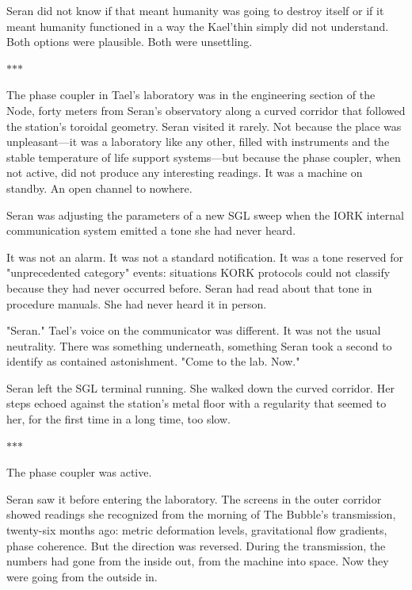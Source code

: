 \documentclass[11pt,a5paper,twoside]{book}
\begin{document}
Seran did not know if that meant humanity was going to destroy itself or if it meant humanity functioned in a way the Kael'thin simply did not understand. Both options were plausible. Both were unsettling.

\vspace{1.5em}
\begin{center}$\ast$\quad$\ast$\quad$\ast$\end{center}
\vspace{1.5em}

The phase coupler in Tael's laboratory was in the engineering section of the Node, forty meters from Seran's observatory along a curved corridor that followed the station's toroidal geometry. Seran visited it rarely. Not because the place was unpleasant—it was a laboratory like any other, filled with instruments and the stable temperature of life support systems—but because the phase coupler, when not active, did not produce any interesting readings. It was a machine on standby. An open channel to nowhere.

Seran was adjusting the parameters of a new SGL sweep when the IORK internal communication system emitted a tone she had never heard.

It was not an alarm. It was not a standard notification. It was a tone reserved for "unprecedented category" events: situations KORK protocols could not classify because they had never occurred before. Seran had read about that tone in procedure manuals. She had never heard it in person.

"Seran." Tael's voice on the communicator was different. It was not the usual neutrality. There was something underneath, something Seran took a second to identify as contained astonishment. "Come to the lab. Now."

Seran left the SGL terminal running. She walked down the curved corridor. Her steps echoed against the station's metal floor with a regularity that seemed to her, for the first time in a long time, too slow.

\vspace{1.5em}
\begin{center}$\ast$\quad$\ast$\quad$\ast$\end{center}
\vspace{1.5em}

The phase coupler was active.

Seran saw it before entering the laboratory. The screens in the outer corridor showed readings she recognized from the morning of The Bubble's transmission, twenty-six months ago: metric deformation levels, gravitational flow gradients, phase coherence. But the direction was reversed. During the transmission, the numbers had gone from the inside out, from the machine into space. Now they were going from the outside in.
\end{document}
